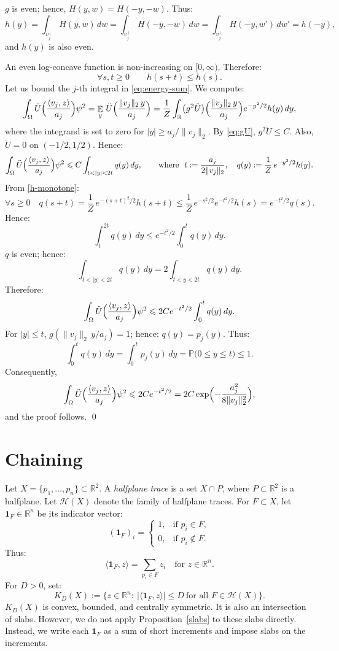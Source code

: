 \documentclass[12pt,reqno]{amsart}
\makeatletter
\def\le{\leqslant}
\def\ge{\geqslant}\def\geq{\geqslant}
\def\le{\leqslant}
\theoremstyle{remark}
\renewenvironment{proof}[1][\proofname]{%
  \par\vspace{\topsep}%
  \normalfont\topsep6\p@\@plus6\p@\relax
  \trivlist
  \item[\hskip\labelsep\itshape #1\@addpunct{.}]\ignorespaces
}{%
  \endtrivlist
}
\numberwithin{equation}{section}
\DeclareMathOperator{\E}{\mathbb{E}}
\newcommand{\one}{\mathbf{1}}
\def \R {\mathbb{R}}
\makeatother
\begin{document}
\begin{proof}
\(g\) is even; hence, \(H(y,w)=H(-y,-w)\). Thus:
\[
h(y)=\int_{v_j^\perp}H(y,w)\,dw=
\int_{v_j^\perp}H(-y,-w)\,dw=
\int_{v_j^\perp}H(-y,w')\,dw'=h(-y),
\]
and \(h(y)\) is also even.
\smallskip%
 
An even log-concave function is non-increasing on \([0,\infty)\). Therefore:
\begin{equation}\label{h-monotone}
\forall s,t\ge0\qquad h(s+t)\le h(s).
\end{equation}
Let us bound the \(j\)-th integral in \eqref{eq:energy-sum}. We compute:
\[
\int_\Omega\ddot U\Bigl(\frac{\langle v_j,z\rangle}{a_j}\Bigr)\psi^2
=\E_y\,\ddot U\Bigl(\frac{\|v_j\|_2\,y}{a_j}\Bigr)
=\frac1Z\int_{\R}\bigl(g^2\ddot U\bigr)\Bigl(\frac{\|v_j\|_2\,y}{a_j}\Bigr)e^{-y^2/2}h(y)\,dy,
\]
where the integrand is set to zero for \(|y|\ge a_j/\|v_j\|_2\). By \eqref{eq:gU}, \(g^2\ddot U\le C\). Also, \(\ddot U=0\) on \((-1/2,1/2)\). Hence:
\[
\int_\Omega\ddot U\Bigl(\frac{\langle v_j,z\rangle}{a_j}\Bigr)\psi^2
\le C\int_{t<|y|<2t}q(y)\,dy,
\qquad\text{where }\ t:=\frac{a_j}{2\|v_j\|_2},\quad q(y):=\frac1Z\,e^{-y^2/2}h(y).
\]
From \eqref{h-monotone}:
\[
\forall s \ge 0\quad 
q(s+t) = \frac1Z\,e^{-(s+t)^2/2}h(s+t) \le 
\frac1Z\, e^{-s^2/2} e^{-t^2/2} h(s) = 
e^{-t^2/2} q(s).
\]
Hence:
\[
\int_t^{2t}q(y)\,dy\le e^{-t^2/2}\int_0^{t}q(y)\,dy.
\]
\(q\) is even; hence:
\[
\int_{t<|y|<2t}q(y)\,dy = 2 \int_{t<y<2t}q(y)\,dy.
\]
Therefore:
\[
\int_\Omega\ddot U\Bigl(\frac{\langle v_j,z\rangle}{a_j}\Bigr)\psi^2 \le 2 C e^{-t^2/2}\int_0^{t}q(y)\,dy.
\]
For \(|y|\le t\), \(g(\|v_j\|_2\,y/a_j)=1\); hence: \(q(y)=p_j(y)\). Thus:
\[
\int_{0}^{t} q(y)\,dy=
\int_{0}^{t} p_j(y)\,dy = \mathbb P\bigl(0 \le y \le t\bigr)\le1.
\]
Consequently,
\[
\int_\Omega\ddot U\Bigl(\frac{\langle v_j,z\rangle}{a_j}\Bigr)\psi^2
\le 2C e^{-t^2/2}
=2C \exp\Bigl(-\frac{a_j^2}{8\|v_j\|_2^2}\Bigr),
\]
and the proof follows. \qed
\end{proof}

\section{Chaining}\label{chaining}
Let \(X=\{p_1,\ldots,p_n\}\subset\R^2\). 
A \emph{halfplane trace} is a set \(X\cap P\), where \(P\subset\R^2\) is a halfplane. Let \(\mathcal H(X)\) denote the family of halfplane traces. For \(F\subset X\), let \(\one_F\in\R^n\) be its indicator vector: 
\[
(\one_F)_i = \begin{cases}
1, & \text{if \(p_i\in F\)},\\
0, & \text{if \(p_i\notin F\)}.
\end{cases}
\]
Thus:
\[
\langle\one_F,z\rangle=\sum_{p_i\in F}z_i\quad \text{for \(z\in\R^n\)}.
\]
For \(D>0\), set:
\[
K_D(X):=\bigl\{z\in\R^n:\ |\langle\one_F,z\rangle|\le D\ \text{for all }F\in\mathcal H(X)\bigr\}.
\]
\(K_D(X)\) is convex, bounded, and centrally symmetric. It is also an intersection of 
slabs. However, we do not apply Proposition~\ref{slabs} to these slabs directly. Instead, we write each \(\one_F\) as a sum of short increments and impose slabs on the increments.
\smallskip%
\end{document}
